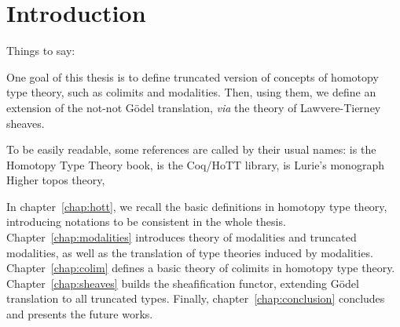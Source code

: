 \chapter{Introduction}
\label{chap:intro}


Things to say:

One goal of this thesis is to define truncated version of concepts of
homotopy type theory, such as colimits and modalities. Then, using
them, we define an extension of the not-not Gödel translation, {\em
  via} the theory of Lawvere-Tierney sheaves.

To be easily readable, some references are called by their usual
names: \cite{hottbook} is the Homotopy Type Theory book,
\cite{hottlib} is the Coq/HoTT library, \cite{lurie} is Lurie's
monograph Higher topos theory, \etc 

In chapter~\ref{chap:hott}, we recall the basic definitions in
homotopy type theory, introducing notations to be consistent in the
whole thesis. Chapter~\ref{chap:modalities} introduces theory of
modalities and truncated modalities, as well as the translation of
type theories induced by modalities. Chapter~\ref{chap:colim} defines
a basic theory of colimits in homotopy type
theory. Chapter~\ref{chap:sheaves} builds the sheafification functor,
extending Gödel translation to all truncated types. Finally,
chapter~\ref{chap:conclusion} concludes and presents the future works.